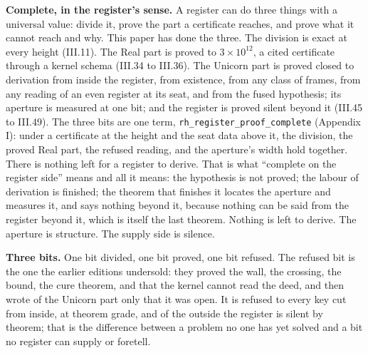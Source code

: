 \documentclass[10pt,twocolumn]{article}
\begin{document}
\textbf{Complete, in the register's sense.} A register can do three
things with a universal value: divide it, prove the part a certificate
reaches, and prove what it cannot reach and why. This paper has done the
three. The division is exact at every height (III.11). The Real part is
proved to \(3 \times 10^{12}\), a cited certificate through a kernel
schema (III.34 to III.36). The Unicorn part is proved closed to
derivation from inside the register, from existence, from any class of
frames, from any reading of an even register at its seat, and from the
fused hypothesis; its aperture is measured at one bit; and the register
is proved silent beyond it (III.45 to III.49). The three bits are one
term, \texttt{rh\_register\_proof\_complete} (Appendix I): under a
certificate at the height and the seat data above it, the division, the
proved Real part, the refused reading, and the aperture's width hold
together. There is nothing left for a register to derive. That is what
``complete on the register side'' means and all it means: the hypothesis
is not proved; the labour of derivation is finished; the theorem that
finishes it locates the aperture and measures it, and says nothing
beyond it, because nothing can be said from the register beyond it,
which is itself the last theorem. Nothing is left to derive. The
aperture is structure. The supply side is silence.

\textbf{Three bits.} One bit divided, one bit proved, one bit refused.
The refused bit is the one the earlier editions undersold: they proved
the wall, the crossing, the bound, the cure theorem, and that the kernel
cannot read the deed, and then wrote of the Unicorn part only that it
was open. It is refused to every key cut from inside, at theorem grade,
and of the outside the register is silent by theorem; that is the
difference between a problem no one has yet solved and a bit no register
can supply or foretell.
\end{document}
